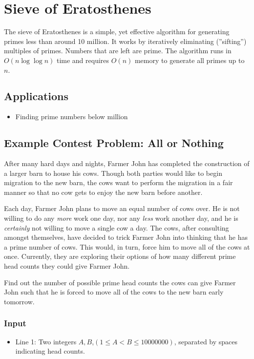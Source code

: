 \section{Sieve of Eratosthenes}
The sieve of Eratosthenes is a simple, yet effective algorithm for generating primes less than around 10 million.
It works by iteratively eliminating (''sifting'') multiples of primes.
Numbers that are left are prime.
The algorithm runs in $O(n\log\log n)$ time and requires $O(n)$ memory to generate all primes up to $n$.


\subsection{Applications}
\begin{itemize}
	\item	Finding prime numbers below  million
\end{itemize}

\subsection{Example Contest Problem: All or Nothing}
After many hard days and nights, Farmer John has completed the construction of a larger barn to house his cows.
Though both parties would like to begin migration to the new barn, the cows want to perform the migration in a fair manner so that no cow gets to enjoy the new barn before another.

Each day, Farmer John plans to move an equal number of cows over.
He is not willing to do any \textit{more} work one day, nor any \textit{less} work another day, and he is \textit{certainly} not willing to move a single cow a day.
The cows, after consulting amongst themselves, have decided to trick Farmer John into thinking that he has a prime number of cows.
This would, in turn, force him to move all of the cows at once.
Currently, they are exploring their options of how many different prime head counts they could give Farmer John.

Find out the number of possible prime head counts the cows can give Farmer John such that he is forced to move all of the cows to the new barn early tomorrow.

\subsubsection{Input}
\begin{itemize}
	\item Line 1: Two integers $A,B$,$(1 \leq A < B \leq 10000000)$, separated by spaces indicating head counts.
\end{itemize}

